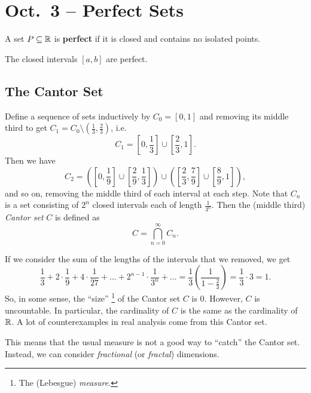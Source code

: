 \chapter{Oct.~3 -- Perfect Sets}

\begin{definition}
  A set $P \subseteq \mathbb{R}$ is \textbf{perfect} if it is closed
  and contains no isolated points.
\end{definition}

\begin{example}
  The closed intervals $[a, b]$ are perfect.
\end{example}

\section{The Cantor Set}
\begin{example}
  Define a sequence of sets inductively by $C_0 = [0, 1]$ and
  removing its middle third to get
  $C_1 = C_0 \setminus (\frac{1}{3}, \frac{2}{3})$, i.e.
  \[C_1 = \left[0, \frac{1}{3}\right] \cup \left[\frac{2}{3}, 1\right].\]
  Then we have
  \[C_2 = \left(\left[0, \frac{1}{9}\right] \cup \left[\frac{2}{9}, \frac{1}{3}\right]\right) \cup \left(\left[\frac{2}{3}, \frac{7}{9}\right] \cup \left[\frac{8}{9}, 1\right]\right),\]
  and so on, removing the middle third of each interval at
  each step. Note that $C_n$ is a set consisting of $2^n$
  closed intervals each of length $\frac{1}{3^n}$. Then
  the (middle third) \textit{Cantor set} $C$ is defined as
  \[C = \bigcap_{n = 0}^\infty C_n.\]
\end{example}

\begin{remark}
If we consider the sum of the lengths of the intervals that we
removed, we get
\[\frac{1}{3} + 2 \cdot \frac{1}{9} + 4 \cdot \frac{1}{27} + \dots + 2^{n - 1} \cdot \frac{1}{3^n} + \dots = \frac{1}{3}\left(\frac{1}{1 - \frac{2}{3}}\right) = \frac{1}{3} \cdot 3 = 1.\]
So, in some sense, the ``size''
\footnote{The (Lebesgue) \textit{measure}.}
of the Cantor set $C$ is 0.
However, $C$ is uncountable. In particular, the cardinality of
$C$ is the same as the cardinality of $\mathbb{R}$. A lot of
counterexamples in real analysis come from this Cantor set.
\end{remark}

\begin{remark}
  This means that the usual measure is not a good way to
  ``catch'' the Cantor set. Instead, we can consider
  \textit{fractional} (or \textit{fractal}) dimensions.
\end{remark}

